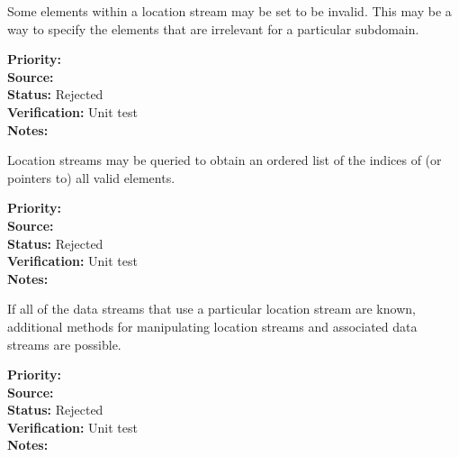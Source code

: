 
Some elements within a location stream may be set to be invalid.  This may be a way
to specify the elements that are irrelevant for a particular subdomain.

\begin{reqlist}
{\bf Priority:} \\
{\bf Source:} \\
{\bf Status:} Rejected \\
{\bf Verification:} Unit test \\
{\bf Notes:} 
\end{reqlist}


Location streams may be queried to obtain an ordered list of the indices of (or
pointers to) all valid elements.

\begin{reqlist}
{\bf Priority:} \\
{\bf Source:} \\
{\bf Status:} Rejected \\
{\bf Verification:} Unit test \\
{\bf Notes:} 
\end{reqlist}

If all of the data streams that use a particular location stream are known,
additional methods for manipulating location streams and associated data streams are
possible.
\begin{reqlist}
{\bf Priority:} \\
{\bf Source:} \\
{\bf Status:} Rejected \\
{\bf Verification:} Unit test \\
{\bf Notes:} 
\end{reqlist}

